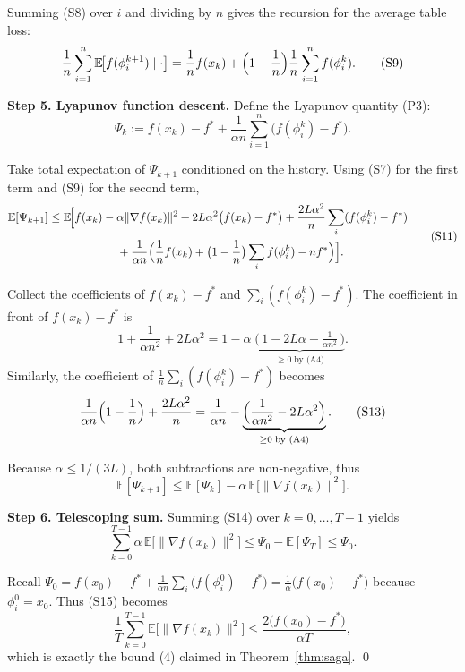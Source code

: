 \documentclass{article}
\newcommand{\E}{\mathbb{E}}
\begin{document}
Summing (S8) over $i$ and dividing by $n$ gives the recursion for the
average table loss:
\[
\frac{1}{n}\sum_{i=1}^{n}\E\!\bigl[f(\phi_i^{k+1})\mid\cdot\bigr]
= \frac{1}{n}f(x_k)+\Bigl(1-\frac{1}{n}\Bigr)
   \frac{1}{n}\sum_{i=1}^{n}f(\phi_i^k). \tag{S9}
\]

\noindent\textbf{Step 5. Lyapunov function descent.}  
Define the Lyapunov quantity (P3):
\[
\Psi_k := f(x_k)-f^{*}
          +\frac{1}{\alpha n}\sum_{i=1}^{n}\bigl(f(\phi_i^k)-f^{*}\bigr).
\tag{S10}
\]

Take total expectation of $\Psi_{k+1}$ conditioned on the history.
Using (S7) for the first term and (S9) for the second term,
\[
\begin{aligned}
\E[\Psi_{k+1}]
&\le \E\!\Bigl[
        f(x_k)-\alpha\|\nabla f(x_k)\|^{2}
        +2L\alpha^{2}\bigl(f(x_k)-f^{*}\bigr)
        +\frac{2L\alpha^{2}}{n}\sum_{i} (f(\phi_i^k)-f^{*}) \\
&\qquad\qquad\qquad
        +\frac{1}{\alpha n}\Bigl(
                \frac{1}{n}f(x_k)
                +\bigl(1-\frac{1}{n}\bigr)\sum_{i}f(\phi_i^k)
                -n f^{*}
              \Bigr)
      \Bigr] .
\end{aligned}
\tag{S11}
\]

Collect the coefficients of $f(x_k)-f^{*}$ and $\sum_i(f(\phi_i^k)-f^{*})$.
The coefficient in front of $f(x_k)-f^{*}$ is
\[
1 + \frac{1}{\alpha n^{2}} + 2L\alpha^{2}
= 1 - \alpha\; \underbrace{\bigl(\,1 - 2L\alpha - \tfrac{1}{\alpha n^{2}}\,\bigr)}_{\ge 0\;\text{by (A4)}} .
\tag{S12}
\]
Similarly, the coefficient of $\frac{1}{n}\sum_i(f(\phi_i^k)-f^{*})$ becomes
\[
\frac{1}{\alpha n}\Bigl(1-\frac{1}{n}\Bigr) + \frac{2L\alpha^{2}}{n}
= \frac{1}{\alpha n} -\underbrace{\Bigl(\frac{1}{\alpha n^{2}}-2L\alpha^{2}\Bigr)}_{\ge 0\;\text{by (A4)}} .
\tag{S13}
\]

Because $\alpha\le 1/(3L)$, both subtractions are non‑negative, thus
\[
\E[\Psi_{k+1}]
\le \E[\Psi_{k}]
     -\alpha\,\E\!\bigl[\|\nabla f(x_k)\|^{2}\bigr].
\tag{S14}
\]

\noindent\textbf{Step 6. Telescoping sum.}  
Summing (S14) over $k=0,\dots ,T-1$ yields
\[
\sum_{k=0}^{T-1}\alpha\,\E\!\bigl[\|\nabla f(x_k)\|^{2}\bigr]
\le \Psi_{0}-\E[\Psi_{T}]
\le \Psi_{0}.
\tag{S15}
\]

Recall $\Psi_{0}=f(x_{0})-f^{*}+\frac{1}{\alpha n}\sum_{i}\bigl(f(\phi_i^{0})-f^{*}\bigr)
= \frac{1}{\alpha}\bigl(f(x_{0})-f^{*}\bigr)$ because $\phi_i^{0}=x_{0}$.
Thus (S15) becomes
\[
\frac{1}{T}\sum_{k=0}^{T-1}\E\!\bigl[\|\nabla f(x_k)\|^{2}\bigr]
\le \frac{2\bigl(f(x_{0})-f^{*}\bigr)}{\alpha T},
\tag{S16}
\]
which is exactly the bound (4) claimed in Theorem~\ref{thm:saga}.
\qed
\end{document}
